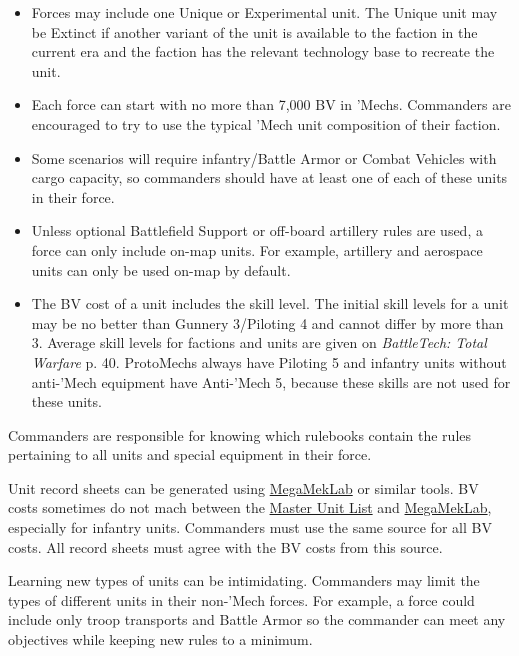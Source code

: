 \begin{itemize}
\item Forces may include one Unique or Experimental unit.
The Unique unit may be Extinct if another variant of the unit is available to the faction in the current era and the faction has the relevant technology base to recreate the unit.

\item Each force can start with no more than 7,000 BV in 'Mechs.
Commanders are encouraged to try to use the typical 'Mech unit composition of their faction.

\item Some scenarios will require infantry/Battle Armor or Combat Vehicles with cargo capacity, so commanders should have at least one of each of these units in their force.

\item Unless optional Battlefield Support or off-board artillery rules are used, a force can only include on-map units.
For example, artillery and aerospace units can only be used on-map by default.

\item The BV cost of a unit includes the skill level.
The initial skill levels for a unit may be no better than Gunnery 3/Piloting 4 and cannot differ by more than 3.
Average skill levels for factions and units are given on \emph{BattleTech: Total Warfare} p. 40.
ProtoMechs always have Piloting 5 and infantry units without anti-'Mech equipment have Anti-'Mech 5, because these skills are not used for these units.

\end{itemize}

Commanders are responsible for knowing which rulebooks contain the rules pertaining to all units and special equipment in their force.

Unit record sheets can be generated using \href{https://megamek.org}{MegaMekLab} or similar tools.
BV costs sometimes do not mach between the \href{http://www.masterunitlist.info}{Master Unit List} and \href{https://megamek.org}{MegaMekLab}, especially for infantry units.
Commanders must use the same source for all BV costs.
All record sheets must agree with the BV costs from this source.

Learning new types of units can be intimidating.
Commanders may limit the types of different units in their non-'Mech forces.
For example, a force could include only troop transports and Battle Armor so the commander can meet any objectives while keeping new rules to a minimum.
